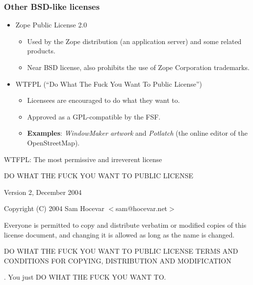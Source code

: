 \documentclass{beamer}
\begin{document}

\begin{frame}
\frametitle{Other BSD-like licenses}

\begin{itemize}
\item \alert{Zope Public License 2.0}
	\begin{itemize}
	\item Used by the Zope distribution (an application server) and some related products. 
	\item Near BSD license, also prohibits the use of Zope Corporation trademarks.
	\end{itemize}
\item \alert{WTFPL} (``Do What The Fuck You Want To Public License'') 
	\begin{itemize}
	\item Licensees are encouraged to do what they want to. 
	\item Approved as a GPL-compatible by the FSF. 
	\item \textbf{Examples}: \textit{WindowMaker artwork} and \textit{Potlatch} (the online editor of the OpenStreetMap).
	\end{itemize}
\end{itemize}

\end{frame}


\begin{frame}

\begin{block}{WTFPL: The most permissive and irreverent license} 

\center DO WHAT THE FUCK YOU WANT TO PUBLIC LICENSE

Version 2, December 2004

\flushleft

Copyright (C) 2004 Sam Hocevar $<$sam@hocevar.net$>$

\smallskip

Everyone is permitted to copy and distribute verbatim or modified
copies of this license document, and changing it is allowed as long
as the name is changed.


\center DO WHAT THE FUCK YOU WANT TO PUBLIC LICENSE
  TERMS AND CONDITIONS FOR COPYING, DISTRIBUTION AND MODIFICATION

. You just DO WHAT THE FUCK YOU WANT TO.

\end{block}
\end{frame}
\end{document}

